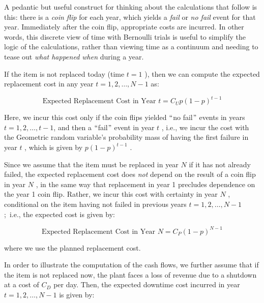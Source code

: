 A pedantic but useful construct for thinking about the calculations that follow is this: there is a {\it coin flip}  for each year, which yields a {\it fail}  or {\it no fail}  event for that year. Immediately after the coin flip, appropriate costs are incurred. In other words, this discrete view of time with Bernoulli trials is useful to simplify the logic of the calculations, rather than viewing time as a continuum and needing to tease out {\it what happened when} during a year.

If the item is not replaced today (time  \( t=1 \) ), then we can compute the expected replacement cost in any year  \( t=1, 2, \ldots ,N-1 \)  as:\par



\begin{equation}\label{npv_1}
\mbox{Expected Replacement Cost in Year } t=C_{U}p \left( 1-p \right) ^{t-1}
\end{equation}


Here, we incur this cost only if the coin flips yielded $``$no fail$"$  events in years  \( t=1, 2, \ldots ,t-1 \), and then a $``$fail$"$  event in year  \( t \) , i.e., we incur the cost with the Geometric random variable’s probability mass of having the first failure in year  \( t \) , which is given by  \( p \left( 1-p \right) ^{t-1} \) .

Since we assume that the item must be replaced in year  \( N \)  if it has not already failed, the expected replacement cost does \textit{not} depend on the result of a coin flip in year  \( N \) , in the same way that replacement in year 1 precludes dependence on the year 1 coin flip. Rather, we incur this cost with certainty in year  \( N \) , conditional on the item having not failed in previous years \(  t=1, 2, \ldots ,N-1 \) ;\  i.e., the expected cost is given by:\par


\begin{equation}\label{npv_2}
\mbox{Expected Replacement Cost in Year }N=C_{P} \left( 1-p \right) ^{N-1}
\end{equation}

where we use the planned replacement cost.

In order to illustrate the computation of the cash flows, we further assume that if the item is not replaced now, the plant faces a loss of revenue due to a shutdown at a cost of  \( C_{D} \)  per day. Then, the expected downtime cost incurred in year  \( t=1, 2, \ldots ,N-1 \)  is given by:\par




